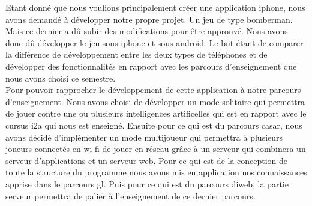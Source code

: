
 Etant donné que nous voulions principalement créer une application
 \gls{iphone}, nous avons demandé à développer notre propre projet. Un jeu de
 type bomberman. Mais ce dernier a dû subir des modifications pour être
 approuvé. Nous avons donc dû développer le jeu sous \gls{iphone} et sous
 \gls{android}. Le but étant de comparer la différence de développement entre
 les deux types de téléphones et de développer des fonctionnalités en rapport
 avec les parcours d'enseignement que nous avons choisi ce semestre.\\
	
	
Pour pouvoir rapprocher le développement de cette application à notre parcours
d'enseignement. Nous avons choisi de développer un mode solitaire qui permettra
de jouer contre une ou plusieurs intelligences artificelles qui est en rapport
avec le cursus \gls{i2a} qui nous est enseigné. Ensuite pour ce qui est du
parcours \gls{casar}, nous avons décidé d'implémenter un mode multijoueur qui
permettra à plusieurs joueurs connectés en \gls{wi-fi} de jouer en réseau grâce
à un serveur qui combinera un serveur d'applications et un serveur web. Pour ce qui est de la conception de toute la structure du programme nous avons mis en application nos connaissances apprise dans le parcours \gls{gl}. Puis pour ce qui est du parcours \gls{diweb}, la partie serveur permettra de palier à
l'enseignement de ce dernier parcours. 
	
